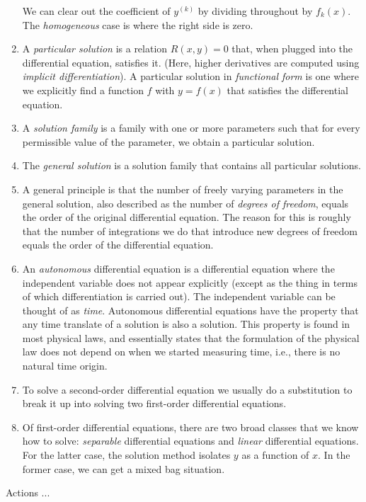 \documentclass[10pt]{amsart}
\begin{document}
\begin{enumerate}
  We can clear out the coefficient of $y^{(k)}$ by dividing throughout
  by $f_k(x)$. The {\em homogeneous} case is where the right side is
  zero.
\item A {\em particular solution} is a relation $R(x,y) = 0$ that,
  when plugged into the differential equation, satisfies it. (Here,
  higher derivatives are computed using {\em implicit
  differentiation}). A particular solution in {\em functional form} is
  one where we explicitly find a function $f$ with $y = f(x)$ that
  satisfies the differential equation.
\item A {\em solution family} is a family with one or more parameters
  such that for every permissible value of the parameter, we obtain a
  particular solution.
\item The {\em general solution} is a solution family that contains
  all particular solutions.
\item A general principle is that the number of freely varying
  parameters in the general solution, also described as the number of
  {\em degrees of freedom}, equals the order of the original
  differential equation. The reason for this is roughly that the
  number of integrations we do that introduce new degrees of freedom
  equals the order of the differential equation.
\item An {\em autonomous} differential equation is a differential
  equation where the independent variable does not appear explicitly
  (except as the thing in terms of which differentiation is carried
  out). The independent variable can be thought of as {\em
  time}. Autonomous differential equations have the property that any
  time translate of a solution is also a solution. This property is
  found in most physical laws, and essentially states that the
  formulation of the physical law does not depend on when we started
  measuring time, i.e., there is no natural time origin.
\item To solve a second-order differential equation we usually do a
  substitution to break it up into solving two first-order
  differential equations.
\item Of first-order differential equations, there are two broad
  classes that we know how to solve: {\em separable} differential
  equations and {\em linear} differential equations. For the latter
  case, the solution method isolates $y$ as a function of $x$. In the
  former case, we can get a mixed bag situation.
\end{enumerate}

Actions ...
\end{document}
